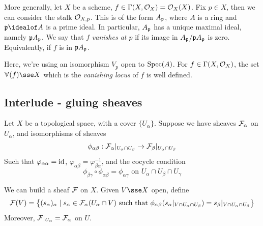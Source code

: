 \documentclass{article}
\begin{document}
\begin{example}
    More generally, let \(X\) be a scheme, \(f \in \Gamma(X, \mathcal{O}_X) = \mathcal{O}_X(X)\). Fix \(p \in X\), then we can consider the stalk \(\mathcal{O}_{X,p}\). This is of the form \(A_{\mathfrak{p}}\), where \(A\) is a ring and \(\mfp\idealof A\) is a prime ideal. In particular, \(A_{\mathfrak{p}}\) has a unique maximal ideal, namely \(\mathfrak{p} A_{\mathfrak{p}}\). We say that \(f\) \emph{vanishes at \(p\)} if its image in \(A_{\mathfrak{p}}/\mathfrak{p} A_{\mathfrak{p}}\) is zero. Equivalently, if \(f\) is in \(\mathfrak{p} A_{\mathfrak{p}}\).

    Here, we're using an isomorphism \(V_p\) open to \(\operatorname{Spec}(A)\). For \(f \in \Gamma(X, \mathcal{O}_X)\), the set \(\van(f) \sse X\) which is the \emph{vanishing locus} of \(f\) is well defined.
\end{example}

\subsection{Interlude - gluing sheaves}

Let \(X\) be a topological space, with a cover \(\{U_\alpha\}\). Suppose we have sheaves \(\mathcal{F}_\alpha\) on \(U_\alpha\), and isomorphisms of sheaves
\[\phi_{\alpha\beta} : \mathcal{F}_\alpha\vert_{U_\alpha \cap U_\beta} \to \mathcal{F}_\beta\vert_{U_\alpha \cap U_\beta}\]
Such that \(\varphi_{\alpha\alpha} = \operatorname{id}\), \(\varphi_{\alpha\beta} = \varphi_{\beta\alpha}^{-1}\), and the cocycle condition
\[\phi_{\beta\gamma} \circ \phi_{\alpha\beta} = \phi_{\alpha\gamma} \text{ on }U_\alpha \cap U_\beta \cap U_\gamma\]

\begin{proposition}
    We can build a sheaf \(\mathcal{F}\) on \(X\). Given \(V \sse X\) open, define
    \[\mathcal{F}(V) = \left\{(s_\alpha)_\alpha \mid s_\alpha \in \mathcal{F}_\alpha(U_\alpha \cap V) \text{ such that }\phi_{\alpha\beta}(s_\alpha\vert_{V \cap U_\alpha \cap U_\beta}) = s_\beta\vert_{V \cap U_\alpha \cap U_\beta}\right\}\]
    Moreover, \(\mathcal{F}\vert_{U_\alpha} = \mathcal{F}_\alpha\) on \(U\).
\end{proposition}
\end{document}
